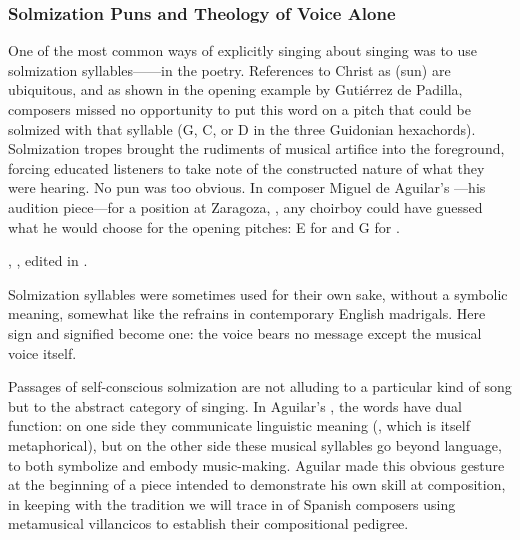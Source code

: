 \subsubsection{Solmization Puns and Theology of Voice Alone}

One of the most common ways of explicitly singing about singing was to use
solmization syllables------in the poetry.
References to Christ as  (sun) are ubiquitous, and as shown in the
opening example by Gutiérrez de Padilla, composers missed no opportunity to put
this word on a pitch that could be solmized with that syllable (G, C, or D in
the three Guidonian hexachords).
Solmization tropes brought the rudiments of musical artifice into the
foreground, forcing educated listeners to take note of the constructed nature
of what they were hearing.
No pun was too obvious.
In composer Miguel de Aguilar's ---his audition piece---for a
position at Zaragoza, , any choirboy could have
guessed what he would choose for the opening pitches: E for  and G for
.
\begin{Footnote}
    , , edited
    in \autocite[34--64]{Ezquerro:MME55}. 
\end{Footnote}
Solmization syllables were sometimes used for their own sake, without a
symbolic meaning, somewhat like the  refrains in contemporary
English madrigals.
Here sign and signified become one: the voice bears no message except the
musical voice itself.


Passages of self-conscious solmization are not alluding to a particular kind of
song but to the abstract category of singing.
In Aguilar's , the words have dual function: on one side
they communicate linguistic meaning (, which is itself
metaphorical), but on the other side these musical syllables go beyond
language, to both symbolize and embody music-making. 
Aguilar made this obvious gesture at the beginning of a piece intended to
demonstrate his own skill at composition, in keeping with the tradition we will
trace in  of Spanish composers using metamusical
villancicos to establish their compositional pedigree.


